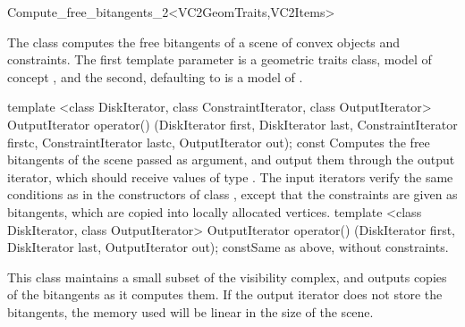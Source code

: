 
\ccRefPageBegin

\begin{ccRefFunctionObjectClass}{Compute_free_bitangents_2<VC2GeomTraits,VC2Items>}

\ccDefinition
  
The class \ccRefName{} computes the free bitangents of a scene of convex
objects and constraints. The first template parameter is a geometric traits
class, model of concept , and the second, defaulting to
 is a model of .


\ccTypes
{}

\ccGlue
{}

\ccOperations
\ccMethod
{template <class DiskIterator, class ConstraintIterator, class OutputIterator>
  OutputIterator operator()
    (DiskIterator first, DiskIterator last,
     ConstraintIterator firstc, ConstraintIterator lastc,
     OutputIterator out); const}
{Computes the free bitangents of the scene passed
as argument, and output them through the output iterator, which should
receive values of type . The input iterators verify the
same conditions as in the constructors of class ,
except that the constraints are given as bitangents, which are copied into
locally allocated vertices.}
\ccMethod
{template <class DiskIterator, class OutputIterator>
  OutputIterator operator()
    (DiskIterator first, DiskIterator last,
     OutputIterator out); const}{Same as above, without constraints.}
\ccTagDefaults


\ccImplementation

This class maintains a small subset of the visibility complex, and outputs
copies of the bitangents as it computes them. If the output iterator does
not store the bitangents, the memory used will be linear in the size of the
scene.


\end{ccRefFunctionObjectClass}
